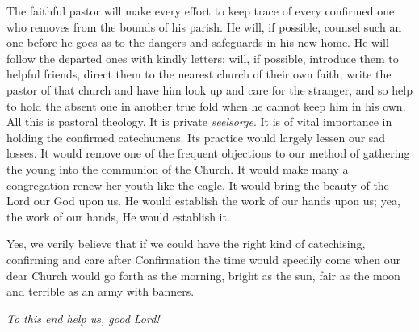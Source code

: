 The faithful pastor will make every effort to keep
 trace of every confirmed one who removes from the bounds of his parish. He will, if possible, counsel such an one before he goes as to the dangers and safeguards in his new home. He will follow the departed ones with kindly letters; will, if possible, introduce them to helpful friends, direct them to the nearest church of their own faith, write the pastor of that church and have him look up and care for the stranger, and so help to hold the absent one in another true fold when he cannot keep him in his own. All this is pastoral theology. It is private \emph{seelsorge}. It is of vital importance in holding the confirmed catechumens. Its practice would largely lessen our sad losses. It would remove one of the frequent objections to our method of gathering the young into the communion of the Church. It would make many a congregation renew her youth like the eagle. It would bring the beauty of the Lord our God upon us. He would establish the work of our hands upon us; yea, the work of our hands, He would establish it.

Yes, we verily believe that if we could have the right kind of catechising, confirming and care after Confirmation the time would speedily come when our dear Church would go forth as the morning, bright as the sun, fair as the moon and terrible as an army with banners.

\emph{To this end help us, good Lord!}

